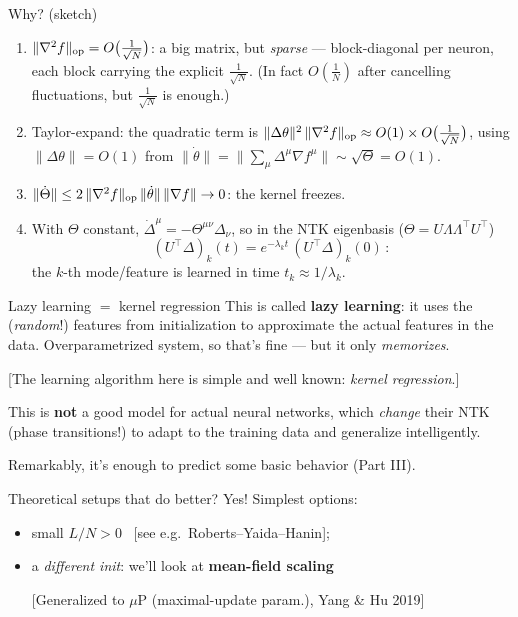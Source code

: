 \documentclass[11pt]{beamer}
\newcommand{\hl}[1]{{\color{blue!60!black}\textbf{#1}}}
\begin{document}
\begin{frame}{Why? (sketch)}
  \begin{enumerate}
    \item $\|\nabla^2 f\|_{\rm op} = O\big(\tfrac{1}{\sqrt N}\big)$: a
      big matrix, but \emph{sparse} --- block-diagonal per neuron, each
      block carrying the explicit $\tfrac{1}{\sqrt N}$. (In fact
      $O(\tfrac1N)$ after cancelling fluctuations, but $\tfrac{1}{\sqrt
      N}$ is enough.)  \pause
    \item Taylor-expand: the quadratic term is
      $\|\Delta\theta\|^2\,\|\nabla^2 f\|_{\rm op} \approx O(1)\times
      O\big(\tfrac{1}{\sqrt N}\big)$, using $\|\Delta\theta\| =
      O(1)$ from $\|\dot\theta\| = \|\sum_\mu \Delta^\mu \nabla f^\mu\|
      \sim \sqrt{\Theta} = O(1)$.   \pause
    \item $\|\dot\Theta\| \leq 2\,\|\nabla^2 f\|_{\rm op}\,
      \|\dot\theta\|\,\|\nabla f\| \to 0$: the kernel freezes.  \pause
    \item With $\Theta$ constant,\; 
      $\dot\Delta^\mu = -\Theta^{\mu\nu}\Delta_\nu$, \; so in the
      NTK eigenbasis ($\Theta = U\Lambda\Lambda^\top U^\top$)
      \[
        (U^{\!\top}\Delta)_k(t) = e^{-\lambda_k t}\,
        (U^{\!\top}\Delta)_k(0)\,:
      \]
      the $k$-th mode/feature is learned in  time
      $\boxed{t_k \approx 1/\lambda_k}$.
  \end{enumerate}
\end{frame}

\begin{frame}{Lazy learning $=$ kernel regression}
  This is called \hl{lazy learning}: it uses the (\emph{random}!)
  features from initialization to approximate the actual features in the
  data. Overparametrized system, so that's fine --- but it only
  \emph{memorizes}.
  \vspace{1mm}

  {\footnotesize [The learning algorithm here is simple and well known:
  \emph{kernel regression}.]}  \pause
  \vspace{4mm}

  This is \hl{not} a good model for actual neural networks, which
  \emph{change} their NTK (phase transitions!) to adapt to the training
  data and generalize intelligently. \pause
  
  Remarkably, it's enough to predict some basic behavior (Part III). \pause
  
  \vspace{3mm}

  Theoretical setups that do better? Yes! Simplest options:
  \begin{itemize}
    \item small $L/N > 0$ \ [see e.g.\ Roberts--Yaida--Hanin];
    \item a \emph{different init}: we'll look at \hl{mean-field
      scaling}
      
      \smallskip
      {\footnotesize[Generalized to $\mu$P (maximal-update
      param.), Yang \& Hu 2019]}
  \end{itemize}
\end{frame}
\end{document}
